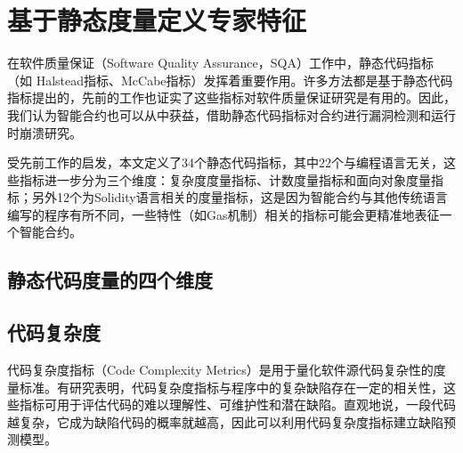 \section{基于静态度量定义专家特征}
\label{sec:基于静态度量定义专家特征}
在软件质量保证（Software Quality Assurance，SQA）工作中，静态代码指标（如 Halstead\cite{halstead}指标、McCabe\cite{mccabe}指标）发挥着重要作用。许多方法都是基于静态代码指标提出的，先前的工作\cite{menzies2007data,meyers2007empirical,zimmermann2007predicting}也证实了这些指标对软件质量保证研究是有用的。因此，我们认为智能合约也可以从中获益，借助静态代码指标对合约进行漏洞检测和运行时崩溃研究。

受先前工作\cite{halstead,mccabe,menzies2007data}的启发，本文定义了34个静态代码指标，其中22个与编程语言无关，这些指标进一步分为三个维度：复杂度度量指标、计数度量指标和面向对象度量指标；另外12个为Solidity语言相关的度量指标，这是因为智能合约与其他传统语言编写的程序有所不同，一些特性（如Gas机制）相关的指标可能会更精准地表征一个智能合约。


\subsection{静态代码度量的四个维度}
\label{sec:静态代码度量的四个维度}
\subsection{代码复杂度}
\label{sec:代码复杂度}

代码复杂度指标（Code Complexity Metrics）是用于量化软件源代码复杂性的度量标准。有研究表明\cite{Chen2019AnEI,singh2015bug}，代码复杂度指标与程序中的复杂缺陷存在一定的相关性，这些指标可用于评估代码的难以理解性、可维护性和潜在缺陷。直观地说，一段代码越复杂，它成为缺陷代码的概率就越高，因此可以利用代码复杂度指标建立缺陷预测模型。

